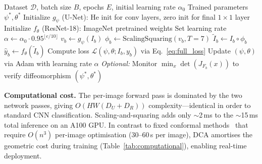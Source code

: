 \documentclass[pdflatex,sn-nature]{sn-jnl}%
\theoremstyle{thmstyleone}%
\theoremstyle{thmstyletwo}%
\theoremstyle{thmstylethree}%
\begin{document}
\begin{algorithm}[t]
\caption{DCA Training Procedure}
\label{alg:training}
\begin{algorithmic}[1]
\REQUIRE Dataset $\mathcal{D}$, batch size $B$, epochs $E$, initial learning rate $\alpha_0$
\ENSURE Trained parameters $\psi^*, \theta^*$
\STATE Initialize $g_\psi$ (U-Net): He init for conv layers, zero init for final $1 \times 1$ layer
\STATE Initialize $f_\theta$ (ResNet-18): ImageNet pretrained weights
    \STATE Set learning rate $\alpha \leftarrow \alpha_0 \cdot 0.95^{\lfloor e/10 \rfloor}$
        \STATE $v_b \leftarrow g_\psi(I_b)$ \quad {}
        \STATE $\phi_b \leftarrow \text{ScalingSquaring}(v_b, T=7)$ \quad {}
        \STATE $\tilde{I}_b \leftarrow I_b \circ \phi_b$ \quad {}
        \STATE $\hat{y}_b \leftarrow f_\theta(\tilde{I}_b)$ \quad {}
        \STATE Compute loss $\mathcal{L}(\psi, \theta; I_b, y_b)$ via Eq.~\eqref{eq:full_loss}
        \STATE Update $(\psi, \theta)$ via Adam with learning rate $\alpha$
        \STATE \textit{Optional:} Monitor $\min_x \det(J_{F_b}(x))$ to verify diffeomorphism
    \ENDFOR
\ENDFOR
\RETURN $(\psi^*, \theta^*)$
\end{algorithmic}
\end{algorithm}


\textbf{Computational cost.} The per-image forward pass is dominated by the two
network passes, giving $O(HW(D_U+D_R))$ complexity---identical in order to
standard CNN classification. Scaling-and-squaring adds only $\sim$2\,ms to the
$\sim$15\,ms total inference on an A100 GPU. In contrast to fixed conformal
methods~\cite{huang2024surface} that require $O(n^3)$ per-image optimisation
(30--60\,s per image), DCA amortises the geometric cost during training
(Table~\ref{tab:computational}), enabling real-time deployment.
\end{document}
